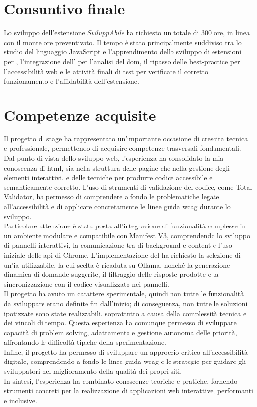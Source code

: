 \section{Consuntivo finale}
\noindent Lo sviluppo dell’estensione \textit{SviluppAbile} ha richiesto un totale di 300 ore, in linea con il monte ore preventivato. Il tempo è stato principalmente suddiviso tra lo studio del linguaggio JavaScript e l’apprendimento dello sviluppo di estensioni per , l’integrazione dell' per l’analisi del \acrshort{dom}, il ripasso delle best-practice per l'accessibilità web e le attività finali di test per verificare il corretto funzionamento e l’affidabilità dell’estensione. 

\section{Competenze acquisite}
\noindent Il progetto di stage ha rappresentato un’importante occasione di crescita tecnica e professionale, permettendo di acquisire competenze trasversali fondamentali. Dal punto di vista dello sviluppo web, l’esperienza ha consolidato la mia conoscenza di \acrshort{html}, sia nella struttura delle pagine che nella gestione degli elementi interattivi, e delle tecniche per produrre codice accessibile e semanticamente corretto. L’uso di strumenti di validazione del codice, come Total Validator, ha permesso di comprendere a fondo le problematiche legate all’accessibilità e di applicare concretamente le linee guida \acrshort{wcag} durante lo sviluppo.\\
Particolare attenzione è stata posta all’integrazione di funzionalità complesse in un ambiente modulare e compatibile con Manifest V3, comprendendo lo sviluppo di pannelli interattivi, la comunicazione tra  di background e content  e l’uso iniziale delle \acrshort{api} di Chrome. L’implementazione del  ha richiesto la selezione di un’\acrshort{ia} utilizzabile, la cui scelta è ricaduta su Ollama, nonché la generazione dinamica di domande suggerite, il filtraggio delle risposte prodotte e la sincronizzazione con il codice visualizzato nei pannelli.\\
Il progetto ha avuto un carattere sperimentale, quindi non tutte le funzionalità da sviluppare erano definite fin dall’inizio; di conseguenza, non tutte le soluzioni ipotizzate sono state realizzabili, soprattutto a causa della complessità tecnica e dei vincoli di tempo. Questa esperienza ha comunque permesso di sviluppare capacità di problem solving, adattamento e gestione autonoma delle priorità, affrontando le difficoltà tipiche della sperimentazione.\\
Infine, il progetto ha permesso di sviluppare un approccio critico all’accessibilità digitale, comprendendo a fondo le linee guida \acrshort{wcag} e le strategie per guidare gli sviluppatori nel miglioramento della qualità dei propri siti. 
\\In sintesi, l’esperienza ha combinato conoscenze teoriche e pratiche, fornendo strumenti concreti per la realizzazione di applicazioni web interattive, performanti e inclusive.

